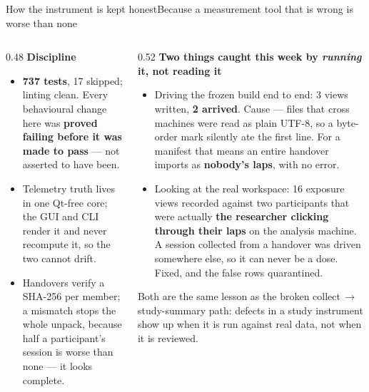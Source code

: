 \documentclass[aspectratio=169,10pt]{beamer}
\newcommand{\kw}[1]{\textcolor{cblue}{\textbf{#1}}}
\newcommand{\code}[1]{{\ttfamily\small #1}}
\begin{document}
\begin{frame}{How the instrument is kept honest}{Because a measurement tool that is wrong is worse than none}
  \begin{columns}[T]
  \begin{column}{0.48\textwidth}\footnotesize
  \textbf{Discipline}
  \begin{itemize}\footnotesize
    \item \kw{737 tests}, 17 skipped; linting clean. Every behavioural change here
      was \kw{proved failing before it was made to pass} --- not asserted to have been.
    \item Telemetry truth lives in one Qt-free core; the GUI and CLI render it and
      never recompute it, so the two cannot drift.
    \item Handovers verify a SHA-256 per member; a mismatch stops the whole unpack,
      because half a participant's session is worse than none --- it looks complete.
  \end{itemize}
  \end{column}
  \begin{column}{0.52\textwidth}\footnotesize
  \textbf{Two things caught this week by \emph{running} it, not reading it}
  \begin{itemize}\footnotesize
    \item Driving the frozen build end to end: 3 views written, \kw{2 arrived}.
      Cause --- files that cross machines were read as plain UTF-8, so a
      byte-order mark silently ate the first line. For a manifest that means an
      entire handover imports as \kw{nobody's laps}, with no error.
    \item Looking at the real workspace: 16 exposure views recorded against two
      participants that were actually \kw{the researcher clicking through their
      laps} on the analysis machine. A session collected from a handover was driven
      somewhere else, so it can never be a dose. Fixed, and the false rows
      quarantined.
  \end{itemize}
  \vspace{0.2em}
  {\color{cgray}\scriptsize Both are the same lesson as the broken
  \code{collect}\,$\rightarrow$\,\code{study-summary} path: defects in a study
  instrument show up when it is run against real data, not when it is reviewed.}
  \end{column}
  \end{columns}
\end{frame}
\end{document}
